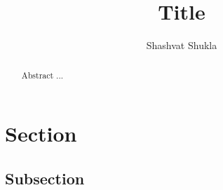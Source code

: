 \documentclass[12pt, a4paper]{article}
\title{Title}
\author{Shashvat Shukla}
\begin{document}
	
	\maketitle
	
	\begin{abstract}
		Abstract ...
	\end{abstract}
	
	\section{Section}
	
	\subsection{Subsection}
	
	
	
	
	
	
	
	
\end{document}
